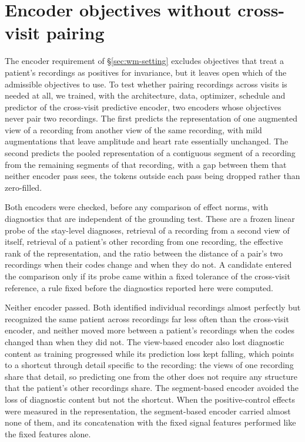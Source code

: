
\section{Encoder objectives without cross-visit pairing}
\label{sec:wm-app-encoder}

The encoder requirement of \S\ref{sec:wm-setting} excludes objectives that treat a patient's recordings as positives for invariance, but it leaves open which of the admissible objectives to use. To test whether pairing recordings across visits is needed at all, we trained, with the architecture, data, optimizer, schedule and predictor of the cross-visit predictive encoder, two encoders whose objectives never pair two recordings. The first predicts the representation of one augmented view of a recording from another view of the same recording, with mild augmentations that leave amplitude and heart rate essentially unchanged. The second predicts the pooled representation of a contiguous segment of a recording from the remaining segments of that recording, with a gap between them that neither encoder pass sees, the tokens outside each pass being dropped rather than zero-filled.

Both encoders were checked, before any comparison of effect norms, with diagnostics that are independent of the grounding test. These are a frozen linear probe of the stay-level diagnoses, retrieval of a recording from a second view of itself, retrieval of a patient's other recording from one recording, the effective rank of the representation, and the ratio between the distance of a pair's two recordings when their codes change and when they do not. A candidate entered the comparison only if its probe came within a fixed tolerance of the cross-visit reference, a rule fixed before the diagnostics reported here were computed.

Neither encoder passed. Both identified individual recordings almost perfectly but recognized the same patient across recordings far less often than the cross-visit encoder, and neither moved more between a patient's recordings when the codes changed than when they did not. The view-based encoder also lost diagnostic content as training progressed while its prediction loss kept falling, which points to a shortcut through detail specific to the recording: the views of one recording share that detail, so predicting one from the other does not require any structure that the patient's other recordings share. The segment-based encoder avoided the loss of diagnostic content but not the shortcut. When the positive-control effects were measured in the representation, the segment-based encoder carried almost none of them, and its concatenation with the fixed signal features performed like the fixed features alone.

